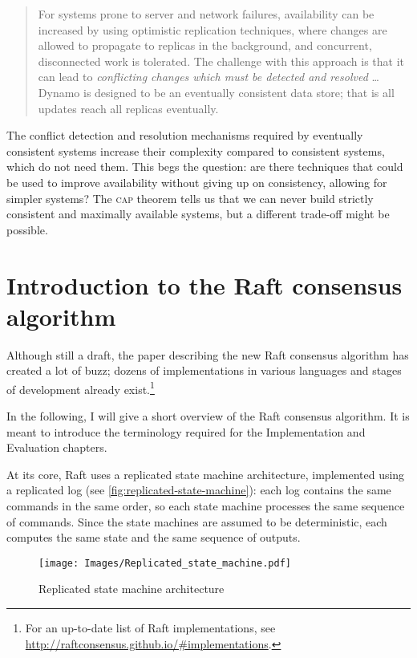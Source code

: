 \documentclass[draft,11pt,chapterprefix=true,toc=bibliography,numbers=noendperiod,
               footnotes=multiple,twoside]{scrreprt}
\begin{document}
\begin{quote}
    For systems prone to server and network failures, availability can be increased by using optimistic replication techniques, where changes are allowed to propagate to replicas in the background, and concurrent, disconnected work is tolerated. The challenge with this approach is that it can lead to \emph{conflicting changes which must be detected and resolved} \dots{} Dynamo is designed to be an eventually consistent data store; that is all updates reach all replicas eventually.
\end{quote}

The conflict detection and resolution mechanisms required by eventually consistent systems increase their complexity compared to consistent systems, which do not need them. This begs the question: are there techniques that could be used to improve availability without giving up on consistency, allowing for simpler systems? The \textsc{cap} theorem tells us that we can never build strictly consistent and maximally available systems, but a different trade-off might be possible.

\section{Introduction to the Raft consensus algorithm\label{ssc:raft-consensus-algorithm}}

Although still a draft, the paper describing the new Raft consensus algorithm \autocite{raft} has created a lot of buzz; dozens of implementations in various languages and stages of development already exist.\footnote{For an up-to-date list of Raft implementations, see \url{http://raftconsensus.github.io/\#implementations}.}

In the following, I will give a short overview of the Raft consensus algorithm. It is meant to introduce the terminology required for the Implementation and Evaluation chapters.

At its core, Raft uses a replicated state machine architecture, implemented using a replicated log (see \autoref{fig:replicated-state-machine}): each log contains the same commands in the same order, so each state machine processes the same sequence of commands. Since the state machines are assumed to be deterministic, each computes the same state and the same sequence of outputs.

\begin{figure}[h]
    \centering
    \texttt{[image: Images/Replicated\_state\_machine.pdf]}
    \caption{Replicated state machine architecture}
    \label{fig:replicated-state-machine}
\end{figure}
\end{document}
